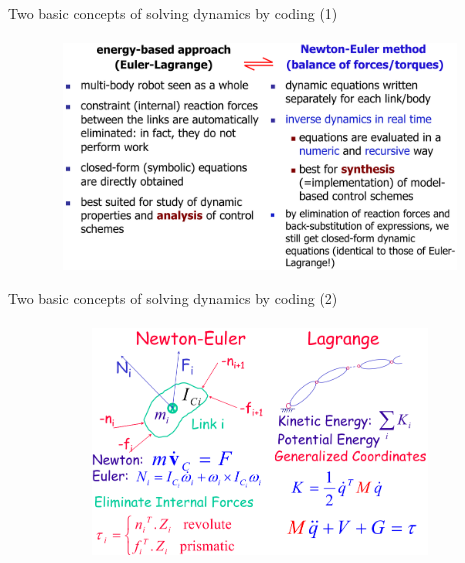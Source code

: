 \documentclass[aspectratio=169]{beamer}
\begin{document}
\begin{frame}[t]{Two basic concepts of solving dynamics by coding (1)}
    \framesubtitle{}
        \vspace{-0.6cm}
        \begin{figure}[H]
            \centering\includegraphics[height=6cm,width=1\textwidth,keepaspectratio]{two_approaches.png}
            \label{fig:two_approaches.png}
        \end{figure}
    \end{frame}
    
    \begin{frame}[t]{Two basic concepts of solving dynamics by coding (2)}
    \framesubtitle{}
        \vspace{-0.6cm}
        \begin{figure}[H]
            \centering\includegraphics[height=6cm,width=1\textwidth,keepaspectratio]{image15.png}
            \label{fig:image15.png}
        \end{figure}
    \end{frame}
    
\end{document}
